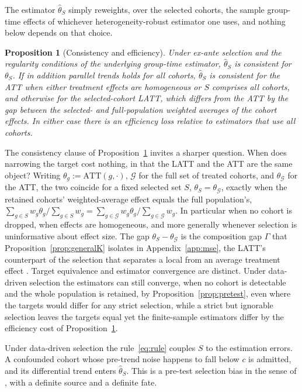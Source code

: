 \documentclass[12pt]{article}
\newtheorem{proposition}{Proposition}
\theoremstyle{remark}
\begin{document}
The estimator $\hat\theta_S$ simply reweights, over the selected cohorts, the sample group-time effects
of whichever heterogeneity-robust estimator one uses, and nothing below depends on that choice.

\begin{proposition}[Consistency and efficiency]\label{prop:cons}
Under ex-ante selection and the regularity conditions of the underlying group-time estimator,
$\hat\theta_S$ is consistent for $\theta_S$. If in addition parallel trends holds for all cohorts,
$\hat\theta_S$ is consistent for the ATT when either treatment effects are homogeneous or $S$ comprises all
cohorts, and otherwise for the selected-cohort LATT, which differs from the ATT by the gap between the
selected- and full-population weighted averages of the cohort effects. In either case there is an
efficiency loss relative to estimators that use all cohorts.
\end{proposition}

The consistency clause of Proposition~\ref{prop:cons} invites a sharper question. When does narrowing the
target cost nothing, in that the LATT and the ATT are the same object? Writing $\theta_g:=\mathrm{ATT}(g,\cdot)$,
$\mathcal G$ for the full set of treated cohorts, and $\theta_{\mathcal G}$ for the ATT, the two coincide for
a fixed selected set $S$, $\theta_S=\theta_{\mathcal G}$, exactly when the retained cohorts' weighted-average
effect equals the full population's,
$\sum_{g\in S}w_g\theta_g/\sum_{g\in S}w_g=\sum_{g\in\mathcal G}w_g\theta_g/\sum_{g\in\mathcal G}w_g$. In
particular when no cohort is dropped, when effects are homogeneous, and more generally whenever selection is
uninformative about effect size. The gap $\theta_S-\theta_{\mathcal G}$ is the composition gap $\Gamma$ that
Proposition~\ref{prop:generalK} isolates in Appendix~\ref{app:mse}, the LATT's counterpart of the selection
that separates a local from an average treatment effect \citep{imbens1994,li2018}. Target equivalence and estimator convergence are
distinct. Under data-driven selection the estimators can still converge, when no cohort is detectable and the
whole population is retained, by Proposition~\ref{prop:pretest}, even where the targets would differ for any
strict selection, while a strict but ignorable selection leaves the targets equal yet the finite-sample
estimators differ by the efficiency cost of Proposition~\ref{prop:cons}.

Under data-driven selection the rule~\eqref{eq:rule} couples $S$ to the estimation errors. A confounded
cohort whose pre-trend noise happens to fall below $c$ is admitted, and its differential trend enters
$\hat\theta_S$. This is a pre-test selection bias in the sense of \citet{roth2022pretrends}, with a
definite source and a definite fate.
\end{document}
